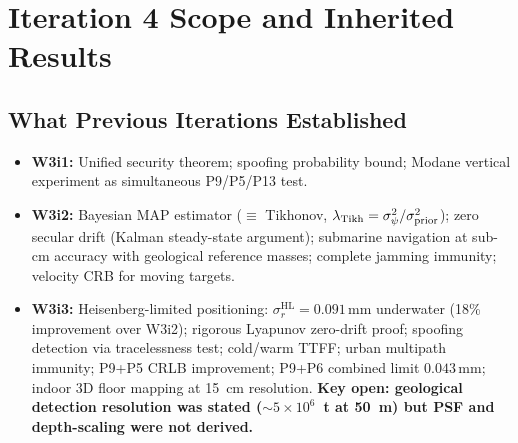 \documentclass[aps,prd,twocolumn,superscriptaddress,nofootinbib]{revtex4-2}
\newcommand{\HL}{\mathrm{HL}}
\begin{document}
\begin{abstract}
Cross-references to P6 (Sec.~\ref{sec:p6cross}), P5
(Sec.~\ref{sec:p5cross}), and P13 (Sec.~\ref{sec:p13cross})
are developed.  The P9+P6 combined 8.7~nm positioning yields
a strain sensitivity of $\varepsilon = 8.7\times10^{-12}$ over
a 1~m baseline, sufficient to detect teleseismic $P$-waves
($h \sim 10^{-9}$) and low-frequency seismic events directly,
creating a hybrid gravitational-seismograph.
\end{abstract}

\maketitle

\section{Iteration 4 Scope and Inherited Results}
\label{sec:scope}

\subsection{What Previous Iterations Established}

\begin{itemize}
\item \textbf{W3i1:} Unified security theorem; spoofing probability bound;
  Modane vertical experiment as simultaneous P9/P5/P13 test.
\item \textbf{W3i2:} Bayesian MAP estimator ($\equiv$ Tikhonov,
  $\lambda_{\rm Tikh} = \sigma_\psi^2/\sigma_{\rm prior}^2$);
  zero secular drift (Kalman steady-state argument); submarine navigation
  at sub-cm accuracy with geological reference masses; complete
  jamming immunity; velocity CRB for moving targets.
\item \textbf{W3i3:} Heisenberg-limited positioning:
  $\sigma_r^{\HL} = 0.091\,\mathrm{mm}$ underwater (18\% improvement
  over W3i2); rigorous Lyapunov zero-drift proof; spoofing detection
  via tracelessness test; cold/warm TTFF; urban multipath immunity;
  P9+P5 CRLB improvement; P9+P6 combined limit $0.043\,\mathrm{mm}$;
  indoor 3D floor mapping at 15~cm resolution.
  \textbf{Key open: geological detection resolution was stated
  ($\sim 5\times10^6$~t at 50~m) but PSF and depth-scaling were
  not derived.}
\end{itemize}
\end{document}
